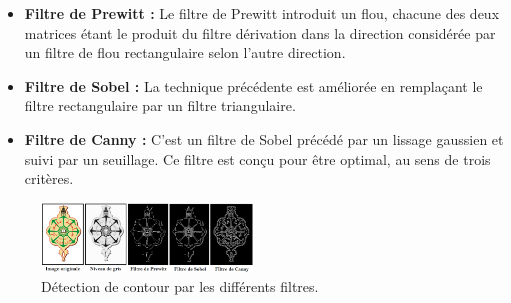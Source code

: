 \begin{itemize}
	\item \textbf{Filtre de Prewitt :}
	Le filtre de Prewitt introduit un flou, chacune des deux matrices étant le
	produit du filtre dérivation dans la direction considérée par un filtre de flou	rectangulaire selon l'autre direction.
	
	\item \textbf{Filtre de Sobel :}
	La technique précédente est améliorée en remplaçant le filtre rectangulaire par un filtre triangulaire.
	
	\item \textbf{Filtre de Canny :}
	C’est un filtre de Sobel précédé par un lissage gaussien et suivi par un
	seuillage. Ce filtre est conçu pour être optimal, au sens de trois critères.
	
\end{itemize}
\begin{figure}[H]
	\centering
	\includegraphics[width=0.5\textwidth]{Figures/conrour} 
	\caption{Détection de contour par les différents filtres.}
\end{figure}
%
